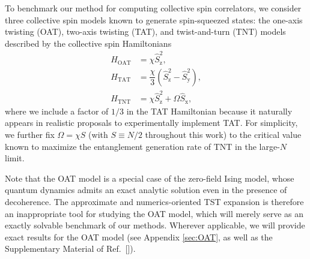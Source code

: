 \documentclass[aps,pra,twocolumn,longbibliography]{revtex4-2}
\renewcommand{\t}{\text} %
\newcommand{\f}[2]{\dfrac{#1}{#2}} %
\newcommand{\p}[1]{\left( #1 \right)} %
\newcommand{\z}{\text{z}}
\newcommand{\x}{\text{x}}
\newcommand{\y}{\text{y}}
\newcommand{\1}{\mathds{1}}
\begin{document}
To benchmark our method for computing collective spin correlators, we
consider three collective spin models known to generate spin-squeezed
states: the one-axis twisting (OAT), two-axis twisting (TAT), and
twist-and-turn (TNT) models described by the collective spin
Hamiltonians\cite{ma2011quantum}
\begin{align}
  H_{\t{OAT}} &= \chi \hat S_\z^2, \label{eq:OAT} \\
  H_{\t{TAT}}
  &= \f{\chi}{3} \p{\hat S_\z^2 - \hat S_\y^2}, \label{eq:TAT} \\
  H_{\t{TNT}} &= \chi \hat S_\z^2 + \Omega \hat S_\x, \label{eq:TNT}
\end{align}
where we include a factor of $1/3$ in the TAT Hamiltonian because it
naturally appears in realistic proposals to experimentally implement
TAT\cite{liu2011spin, huang2015twoaxis}.  For simplicity, we further
fix $\Omega=\chi S$ (with $S\equiv N/2$ throughout this work) to the
critical value known to maximize the entanglement generation rate of
TNT in the large-$N$ limit\cite{micheli2003manyparticle,
  sorelli2019fast}.

Note that the OAT model is a special case of the zero-field Ising
model, whose quantum dynamics admits an exact analytic solution even
in the presence of decoherence\cite{foss-feig2013nonequilibrium}.  The
approximate and numerics-oriented TST expansion is therefore an
inappropriate tool for studying the OAT model, which will merely serve
as an exactly solvable benchmark of our methods.  Wherever applicable,
we will provide exact results for the OAT model (see Appendix
\ref{sec:OAT}, as well as the Supplementary Material of
Ref.~[]).
\end{document}
